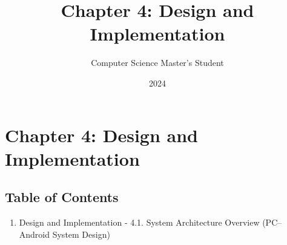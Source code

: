 \documentclass[12pt,a4paper]{article}
\title{Chapter 4: Design and Implementation}
\author{Computer Science Master's Student}
\date{2024}
\begin{document}
\maketitle

\section{Chapter 4: Design and Implementation}

\subsection{Table of Contents}

\begin{enumerate}
\item Design and Implementation
    -
    4.1. System Architecture Overview (PC–Android System Design)
\end{enumerate}
\end{document}
